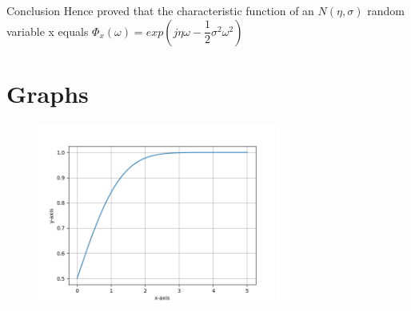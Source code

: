 \documentclass{beamer}
\begin{document}
\begin{frame}{Conclusion}
Hence proved that the characteristic function of an $N(\eta,\sigma)$ random variable x equals $\Phi_x(\omega)=exp(j  \eta  \omega-\dfrac{1}{2}  \sigma^2 \omega^2)$
\end{frame}
\section{Graphs}
\begin{frame}{}
\begin{figure}[htb!]
    \centering
    \includegraphics[width=8cm]{figures/fig1.png}
    \caption{}
    \label{fig:my_label}
\end{figure}
\end{frame}
\end{document}
